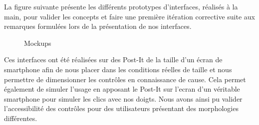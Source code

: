 
La figure suivante présente les différents prototypes d'interfaces, réalisés à la main, pour valider les concepts et faire une première itération corrective suite aux remarques formulées lors de la présentation de nos interfaces. \\

\begin{figure}[H]
    \label{fig-mockup1}
    \noindent{}
    \noindent{}
    \caption{Mockups}
\end{figure}

Ces interfaces ont été réalisées sur des Post-It de la taille d'un écran de smartphone afin de nous placer dans les conditions réelles de taille et nous permettre de dimensionner les contrôles en connaissance de cause. Cela permet également de simuler l'usage en apposant le Post-It sur l'ecran d'un véritable smartphone pour simuler les clics avec nos doigts. Nous avons ainsi pu valider l'accessibilité des contrôles pour des utilisateurs présentant des morphologies différentes.